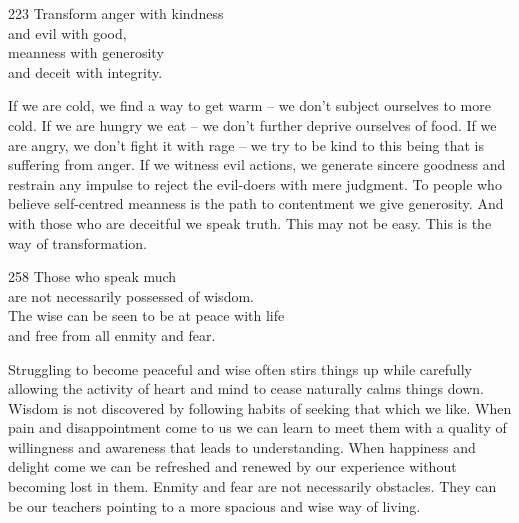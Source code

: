
\begin{dhpVerse}{223}
\label{dhp-223}
Transform anger with kindness\\
and evil with good,\\
meanness with generosity\\
and deceit with integrity.
\end{dhpVerse}

\begin{dhpRefl}

If we are cold, we find a way to get warm -- we don't subject
ourselves to more cold. If we are hungry we eat -- we don't further
deprive ourselves of food. If we are angry, we don't fight it with
rage -- we try to be kind to this being that is suffering from anger.
If we witness evil actions, we generate sincere goodness and restrain
any impulse to reject the evil-doers with mere judgment. To people
who believe self-centred meanness is the path to contentment we give
generosity. And with those who are deceitful we speak truth. This may
not be easy. This is the way of transformation.

\end{dhpRefl}


\begin{dhpVerse}{258}
\label{dhp-258}
Those who speak much\\
are not necessarily possessed of wisdom.\\
The wise can be seen to be at peace with life\\
and free from all enmity and fear.
\end{dhpVerse}

\begin{dhpRefl}

Struggling to become peaceful and wise often stirs things up while
carefully allowing the activity of heart and mind to cease naturally
calms things down. Wisdom is not discovered by following habits of
seeking that which we like. When pain and disappointment come to us
we can learn to meet them with a quality of willingness and awareness
that leads to understanding. When happiness and delight come we can
be refreshed and renewed by our experience without becoming lost in
them. Enmity and fear are not necessarily obstacles. They can be our
teachers pointing to a more spacious and wise way of living.

\end{dhpRefl}

